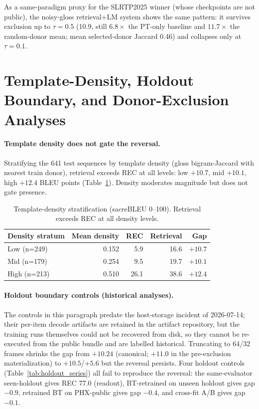 \documentclass[pdflatex,sn-chicago]{sn-jnl}
\begin{document}
As a same-paradigm proxy for the SLRTP2025 winner (whose checkpoints are not public), the noisy-gloss retrieval+LM system shows the same pattern: it survives exclusion up to $\tau{=}0.5$ (10.9, still $6.8\times$ the PT-only baseline and $11.7\times$ the random-donor mean; mean selected-donor Jaccard 0.46) and collapses only at $\tau{=}0.1$.


\section{Template-Density, Holdout Boundary, and Donor-Exclusion Analyses}
\label{sec:appendix_template_boundary}
\label{sec:donor_decomposition}
\label{sec:frozen-template-holdout}
\label{sec:aggressive-donor-audit}

\paragraph{Template density does not gate the reversal.}
Stratifying the 641 test sequences by template density (gloss bigram-Jaccard with nearest train donor), retrieval exceeds REC at all levels: low $+10.7$, mid $+10.1$, high $+12.4$ BLEU points (Table~\ref{tab:template_density_strata}). Density moderates magnitude but does not gate presence.

\begin{table}[h]
\centering
\small
\caption{Template-density stratification (sacreBLEU 0--100). Retrieval exceeds REC at all density levels.}
\label{tab:template_density_strata}
\begin{tabular}{lrrrr}
\toprule
Density stratum & Mean density & REC & Retrieval & Gap \\
\midrule
Low  (n=249)  & 0.152 & 5.9 & 16.6 & $+10.7$ \\
Mid  (n=179)  & 0.254 & 9.5 & 19.7 & $+10.1$ \\
High (n=213)  & 0.510 & 26.1 & 38.6 & $+12.4$ \\
\bottomrule
\end{tabular}
\end{table}

\paragraph{Holdout boundary controls (historical analyses).}
The controls in this paragraph predate the host-storage incident of 2026-07-14; their per-item decode artifacts are retained in the artifact repository, but the training runs themselves could not be recovered from disk, so they cannot be re-executed from the public bundle and are labelled historical. Truncating to 64/32 frames shrinks the gap from $+10.24$ (canonical; $+11.0$ in the pre-exclusion materialization) to $+10.5$/$+5.6$ but the reversal persists. Four holdout controls (Table~\ref{tab:holdout_series}) all fail to reproduce the reversal: the same-evaluator seen-holdout gives REC 77.0 (readout), BT-retrained on unseen holdout gives gap $-0.9$, retrained BT on PHX-public gives gap $-0.4$, and cross-fit A/B gives gap $-0.1$.
\end{document}
